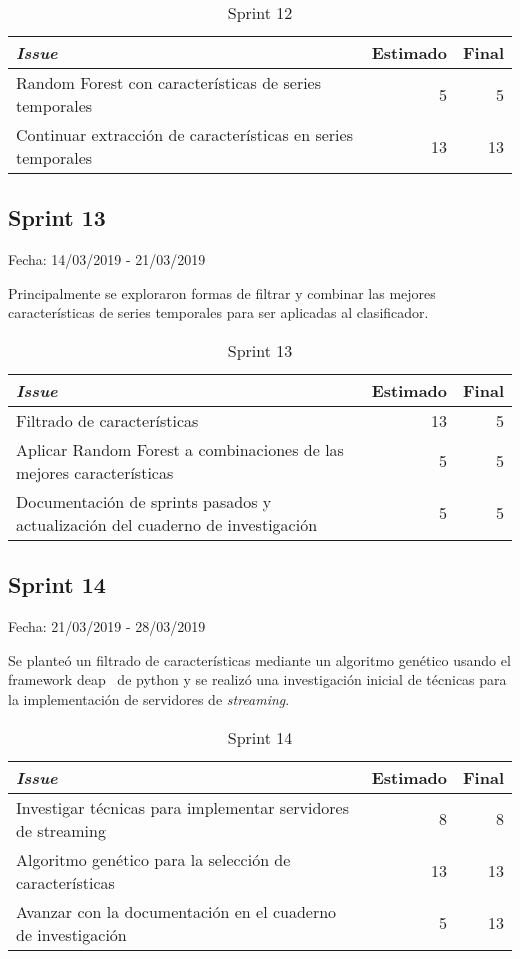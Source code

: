 \begin{table}[H]
	\begin{tabularx}{\textwidth}{Xrr}
		\toprule \textbf{\textit{Issue}} & \textbf{Estimado} & \textbf{Final}\\
		\toprule
		Random Forest con características de series temporales & 5 & 5 \\
		Continuar extracción de características en series temporales & 13 & 13 \\
		\bottomrule
	\end{tabularx}
	\caption{Sprint 12}
\end{table}

\subsection{Sprint 13}

Fecha: 14/03/2019 - 21/03/2019

Principalmente se exploraron formas de filtrar y combinar las mejores características de series temporales para ser aplicadas al clasificador. 

\begin{table}[H]
	\begin{tabularx}{\textwidth}{Xrr}
		\toprule \textbf{\textit{Issue}} & \textbf{Estimado} & \textbf{Final}\\
		\toprule 
		Filtrado de características & 13 & 5 \\
		Aplicar Random Forest a combinaciones de las mejores características & 5 & 5 \\
		Documentación de sprints pasados y actualización del cuaderno de investigación & 5 & 5 \\
		\bottomrule
	\end{tabularx}
	\caption{Sprint 13}
\end{table}

\subsection{Sprint 14}

Fecha: 21/03/2019 - 28/03/2019

Se planteó un filtrado de características mediante un algoritmo genético usando el framework deap~\cite{deap} de python y se realizó una investigación inicial de técnicas para la implementación de servidores de \textit{streaming}. 

\begin{table}[H]
	\begin{tabularx}{\textwidth}{Xrr}
		\toprule \textbf{\textit{Issue}} & \textbf{Estimado} & \textbf{Final}\\
		\toprule 
		Investigar técnicas para implementar servidores de streaming & 8 & 8 \\
		Algoritmo genético para la selección de características & 13 & 13 \\
		Avanzar con la documentación en el cuaderno de investigación & 5 & 13 \\
		\bottomrule
	\end{tabularx}
	\caption{Sprint 14}
\end{table}

